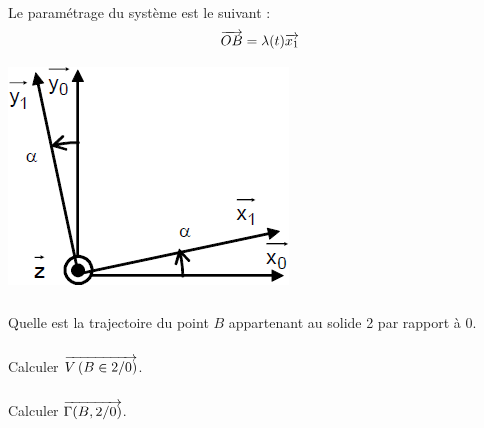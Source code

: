 \documentclass[10pt,fleqn]{article} %
\begin{document}
\begin{multicols}{2}
Le paramétrage du système est le suivant :
$$
\overrightarrow{OB} = \lambda(t) \overrightarrow{x_1}
$$


\begin{center}
\includegraphics[width=.45\linewidth]{images/parametrage}
\end{center}




\subparagraph{}
Quelle est la trajectoire du point $B$ appartenant au solide 2 par rapport à 0.
\ifprof
\begin{corrige}
\end{corrige}\else \fi

\subparagraph{}
Calculer $\overrightarrow{V\left( {B} \in {2}/{0}\right)}$.
\ifprof
\begin{corrige}
\end{corrige}\else \fi

\subparagraph{}
Calculer $\overrightarrow{\Gamma(B,2/0)}$.

\ifprof
\begin{corrige}
\end{corrige}\else \fi

\end{multicols}
\newpage \setcounter{exo}{0}
\end{document}
